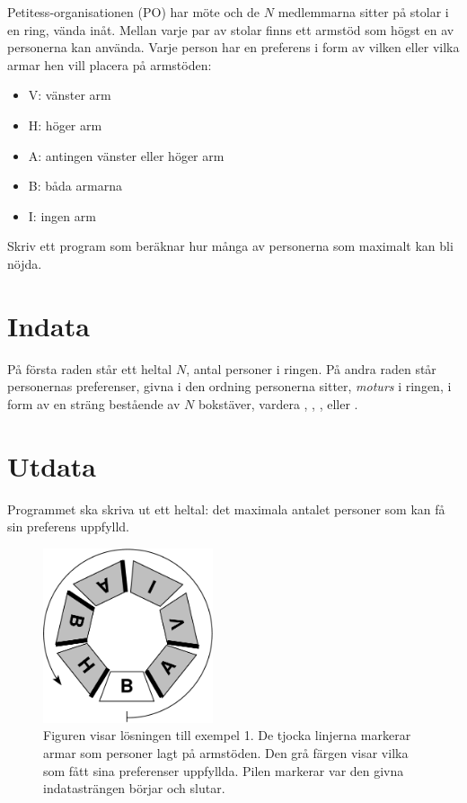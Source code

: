 
Petitess-organisationen (PO) har möte och de $N$ medlemmarna sitter på
stolar i en ring, vända inåt. Mellan varje par av stolar finns ett armstöd som högst en av personerna kan använda. Varje person har en preferens i form av vilken eller vilka armar hen vill placera på armstöden:
\begin{itemize}
\item V: vänster arm
\item H: höger arm
\item A: antingen vänster eller höger arm
\item B: båda armarna
\item I: ingen arm
\end{itemize}

Skriv ett program som beräknar hur många av personerna som maximalt kan bli nöjda.

\section*{Indata}
På första raden står ett heltal $N$, antal personer i ringen. På andra raden står personernas preferenser, givna i den ordning
personerna sitter, {\em moturs} i ringen, i form av en
sträng bestående av $N$ bokstäver, vardera , ,
,  eller . 

\section*{Utdata}
Programmet ska skriva ut ett heltal: det maximala antalet personer som kan få sin preferens uppfylld.

\begin{figure}[!htb]
\begin{center}
\includegraphics[width=5cm]{armstodbild.pdf}
\end{center}
\caption{Figuren visar lösningen till exempel 1. De tjocka linjerna markerar
armar som personer lagt på armstöden. Den grå färgen visar vilka som fått sina preferenser uppfyllda. Pilen markerar var den givna
indatasträngen börjar och slutar.}
\end{figure}

